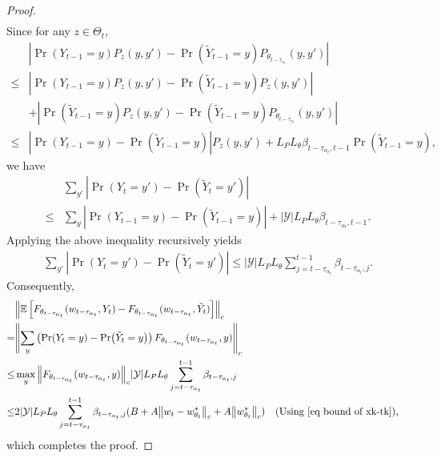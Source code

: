 \documentclass[twoside,11pt]{article}
\newcommand{\fY}{\mathcal{Y}}
\newcommand{\E}{\mathbb{E}}
\newcommand{\ny}{{|\fY|}}
\numberwithin{assucounter}{section}
\begin{document}
\begin{proof}
\begin{align}
  \end{align}
Since for any $z \in \Theta_{t}$,
\begin{align}
  &\left| \Pr(Y_{t-1} = y) P_z(y, y') - \Pr(\tilde Y_{t-1} = y) P_{\theta_{t-\tau_{\alpha_t}}}(y, y')\right| \\
  \leq & \left| \Pr(Y_{t-1} = y) P_z(y, y') - \Pr(\tilde Y_{t-1} = y) P_{z}(y, y')\right| \\
  &+ \left| \Pr(\tilde Y_{t-1} = y) P_z(y, y') - \Pr(\tilde Y_{t-1} = y) P_{\theta_{t-\tau_{\alpha_t}}}(y, y')\right| \\
  \leq & \left| \Pr(Y_{t-1} = y) - \Pr(\tilde Y_{t-1} = y) \right| P_z(y, y') + L_PL_\theta \beta_{t-\tau_{\alpha_t}, t-1} \Pr(\tilde Y_{t-1} = y),
\end{align}
we have
\begin{align}
  &\sum_{y'} \left|\Pr(Y_t = y') - \Pr(\tilde Y_t = y') \right| \\
  \leq & \sum_y \left| \Pr(Y_{t-1} = y) - \Pr(\tilde Y_{t-1} = y) \right| + \ny L_PL_\theta \beta_{t-\tau_{\alpha_t}, t-1}.
\end{align}
Applying the above inequality recursively yields
\begin{align}
  \label{eq y difference two chains}
  \sum_{y'} \left|\Pr(Y_t = y') - \Pr(\tilde Y_t = y') \right| \leq \ny L_PL_\theta \sum_{j=t-\tau_{\alpha_t}}^{t-1} \beta_{t-\tau_{\alpha_t}, j}.
\end{align}
Consequently,
\begin{align}
  &\norm{ \E \left[{F_{\theta_{t - \tau_{\alpha_t}}}(w_{t - \tau_{\alpha_t}}, Y_t) -F_{\theta_{t - \tau_{\alpha_t}}}(w_{t - \tau_{\alpha_t}}, \tilde Y_t)} \right]}_c \\
  =& \norm{\sum_y \left(\Pr(Y_t = y) - \Pr(\tilde Y_t = y)\right) F_{\theta_{t-\tau_{\alpha_t}}}(w_{t-\tau_{\alpha_t}}, y)}_c \\
  \leq &\max_y \norm{F_{\theta_{t-\tau_{\alpha_t}}}(w_{t-\tau_{\alpha_t}}, y)}_c \ny L_PL_\theta \sum_{j=t-\tau_{\alpha_t}}^{t-1}\beta_{t-\tau_{\alpha_t}, j} \\
  \leq & 2\ny L_PL_\theta \sum_{j=t-\tau_{\alpha_t}}^{t-1}\beta_{t-\tau_{\alpha_t}, j}(B + A \norm{w_t - w^*_{\theta_t}}_c + A \norm{w^*_{\theta_t}}_c) \qq{(Using \eqref{eq bound of xk-tk}),}
\end{align}
which completes the proof.
\end{proof}
\end{document}
